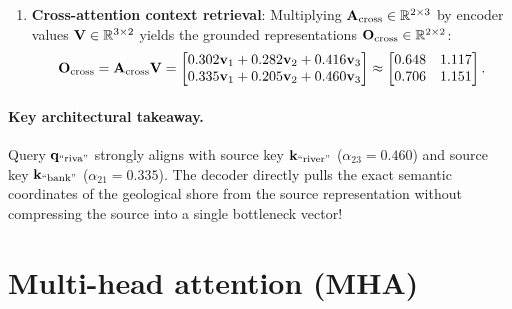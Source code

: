 \documentclass[../../main.tex]{subfiles}
\begin{document}
\begin{enumerate}
\begin{itemize}
    \end{itemize}
    This yields the rectangular cross-attention matrix:
    \begin{equation}
    \label{eq:cross_attn_weights}
    \mA_{\text{cross}} = \begin{bmatrix}
    0.302 & 0.282 & 0.416 \\
    0.335 & 0.205 & 0.460
    \end{bmatrix} \in \R^{2 \times 3}.
    \end{equation}
    \item \textbf{Cross-attention context retrieval}:
    Multiplying $\mathbf{A}_{\text{cross}} \in \mathbb{R}^{2 \times 3}$ by encoder values $\mathbf{V} \in \mathbb{R}^{3 \times 2}$ yields the grounded representations $\mathbf{O}_{\text{cross}} \in \mathbb{R}^{2 \times 2}$:
    \begin{equation}
    \label{eq:cross_output_matrix}
    \mathbf{O}_{\text{cross}} = \mathbf{A}_{\text{cross}} \mathbf{V} = \begin{bmatrix}
    0.302 \mathbf{v}_1 + 0.282 \mathbf{v}_2 + 0.416 \mathbf{v}_3 \\
    0.335 \mathbf{v}_1 + 0.205 \mathbf{v}_2 + 0.460 \mathbf{v}_3
    \end{bmatrix}
    \approx \begin{bmatrix}
    0.648 & 1.117 \\
    0.706 & 1.151
    \end{bmatrix}.
    \end{equation}
\end{enumerate}
\paragraph{Key architectural takeaway.}
Query $\mathbf{q}_{\text{``riva''}}$ strongly aligns with source key $\mathbf{k}_{\text{``river''}}$ ($\alpha_{23} = 0.460$) and source key $\mathbf{k}_{\text{``bank''}}$ ($\alpha_{21} = 0.335$). The decoder directly pulls the exact semantic coordinates of the geological shore from the source representation without compressing the source into a single bottleneck vector!

\clearpage
\section{Multi-head attention (MHA)}
\label{sec:multi_head_attention}
\end{document}
